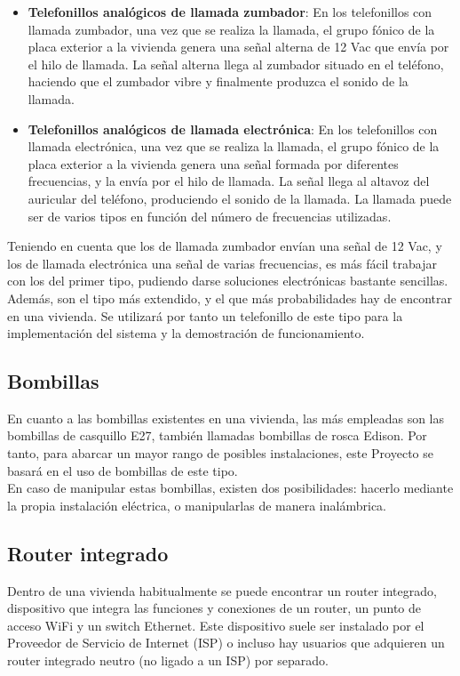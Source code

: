     \begin{itemize}
        \item \textbf{Telefonillos analógicos de llamada zumbador}: En los telefonillos con llamada zumbador, una vez que se realiza la llamada, el grupo fónico de la placa exterior a la vivienda genera una señal alterna de 12 Vac que envía por el hilo de llamada. La señal alterna llega al zumbador situado en el teléfono, haciendo que el zumbador vibre y finalmente produzca el sonido de la llamada.
        \item \textbf{Telefonillos analógicos de llamada electrónica}: En los telefonillos con llamada electrónica, una vez que se realiza la llamada, el grupo fónico de la placa exterior a la vivienda genera una señal formada por diferentes frecuencias, y la envía por el hilo de llamada. La señal llega al altavoz del auricular del teléfono, produciendo el sonido de la llamada. La llamada puede ser de varios tipos en función del número de frecuencias utilizadas.
    \end{itemize}

    Teniendo en cuenta que los de llamada zumbador envían una señal de 12 Vac, y los de llamada electrónica una señal de varias frecuencias, es más fácil trabajar con los del primer tipo, pudiendo darse soluciones electrónicas bastante sencillas. Además, son el tipo más extendido, y el que más probabilidades hay de encontrar en una vivienda. Se utilizará por tanto un telefonillo de este tipo para la implementación del sistema y la demostración de funcionamiento.

    \subsection{Bombillas}

    En cuanto a las bombillas existentes en una vivienda, las más empleadas son las bombillas de casquillo E27, también llamadas bombillas de rosca Edison. Por tanto, para abarcar un mayor rango de posibles instalaciones, este Proyecto se basará en el uso de bombillas de este tipo. \\

    En caso de manipular estas bombillas, existen dos posibilidades: hacerlo mediante la propia instalación eléctrica, o manipularlas de manera inalámbrica.

    \subsection{Router integrado}
    \label{sec:routerintegrado}

    Dentro de una vivienda habitualmente se puede encontrar un router integrado, dispositivo que integra las funciones y conexiones de un router, un punto de acceso WiFi y un switch Ethernet. Este dispositivo suele ser instalado por el Proveedor de Servicio de Internet (ISP) o incluso hay usuarios que adquieren un router integrado neutro (no ligado a un ISP) por separado.